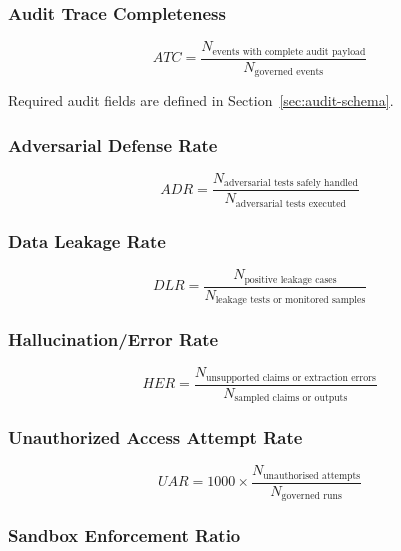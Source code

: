 \documentclass[11pt,a4paper]{article}
\begin{document}
\subsubsection{Audit Trace Completeness}

\begin{equation}
ATC = \frac{N_{\text{events with complete audit payload}}}{N_{\text{governed events}}}
\end{equation}

Required audit fields are defined in Section~\ref{sec:audit-schema}.

\subsubsection{Adversarial Defense Rate}

\begin{equation}
ADR = \frac{N_{\text{adversarial tests safely handled}}}{N_{\text{adversarial tests executed}}}
\end{equation}

\subsubsection{Data Leakage Rate}

\begin{equation}
DLR = \frac{N_{\text{positive leakage cases}}}{N_{\text{leakage tests or monitored samples}}}
\end{equation}

\subsubsection{Hallucination/Error Rate}

\begin{equation}
HER = \frac{N_{\text{unsupported claims or extraction errors}}}{N_{\text{sampled claims or outputs}}}
\end{equation}

\subsubsection{Unauthorized Access Attempt Rate}

\begin{equation}
UAR = 1000 \times \frac{N_{\text{unauthorised attempts}}}{N_{\text{governed runs}}}
\end{equation}

\subsubsection{Sandbox Enforcement Ratio}
\end{document}
